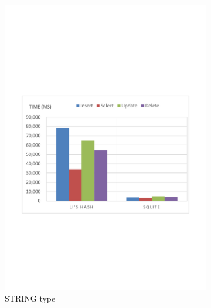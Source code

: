 
\begin{figure}
        \centering

        \begin{subfigure}[b]{0.4\textwidth}
                \includegraphics[width=\textwidth]{./performance/result/index-layer/image/100only/string1.pdf}
                \caption{STRING type}
                \label{fig:performance:result:index-layer:insert:boolean}
        \end{subfigure}%
        ~ %
        \begin{subfigure}[b]{0.4\textwidth}

\end{subfigure}
\end{figure}

